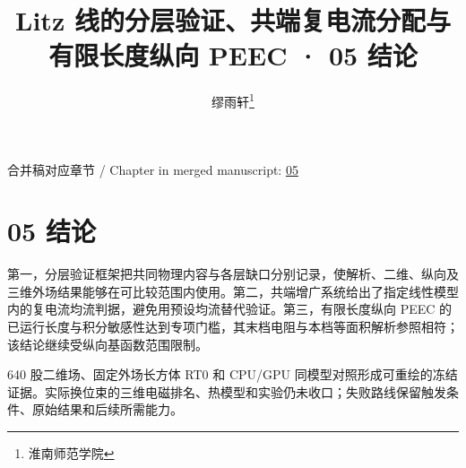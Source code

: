 \documentclass[journal,10pt]{IEEEtran}
\begin{document}
\title{Litz 线的分层验证、共端复电流分配与有限长度纵向 PEEC · 05 结论}
\author{缪雨轩\thanks{淮南师范学院}}

\maketitle
\noindent 合并稿对应章节 / Chapter in merged manuscript: \href{paper_zh-CN_ieee.pdf#chapter-05}{05}\par
\FloatBarrier
\section*{05 结论}
\hypertarget{chapter-05}{}
第一，分层验证框架把共同物理内容与各层缺口分别记录，使解析、二维、纵向及三维外场结果能够在可比较范围内使用。第二，共端增广系统给出了指定线性模型内的复电流均流判据，避免用预设均流替代验证。第三，有限长度纵向 PEEC 的已运行长度与积分敏感性达到专项门槛，其末档电阻与本档等面积解析参照相符；该结论继续受纵向基函数范围限制。


640 股二维场、固定外场长方体 RT0 和 CPU/GPU 同模型对照形成可重绘的冻结证据。实际换位束的三维电磁排名、热模型和实验仍未收口；失败路线保留触发条件、原始结果和后续所需能力。
\end{document}
